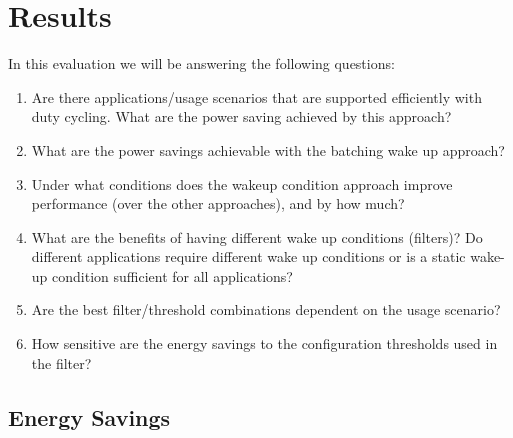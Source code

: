 \section{Results}
\label{sec:results}

In this evaluation we will be answering the following questions:

\begin{enumerate}
\setlength{\itemsep}{-3pt}  

\item Are there applications/usage scenarios that are supported
efficiently with duty cycling.  What are the power saving achieved by
this approach?

\item What are the power savings achievable with the batching wake up approach?

\item Under what conditions does the wakeup condition approach improve
performance (over the other approaches), and by how much?

\item What are the benefits of having different wake up conditions
(filters)?  Do different applications require different wake up conditions or is
a static wake-up condition sufficient for all applications? 

\item Are the best filter/threshold combinations dependent on the usage
scenario?

\item How sensitive are the energy savings to the configuration thresholds
used in the filter?

\end{enumerate}

\subsection{Energy Savings}

